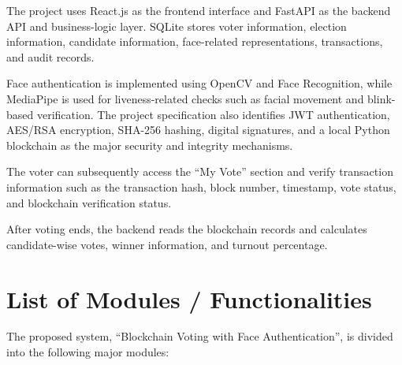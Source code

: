 \documentclass[12pt,a4paper]{report}
\begin{document}
The project uses React.js as the frontend interface and FastAPI as the backend API and business-logic layer. SQLite stores voter information, election information, candidate information, face-related representations, transactions, and audit records.

Face authentication is implemented using OpenCV and Face Recognition, while MediaPipe is used for liveness-related checks such as facial movement and blink-based verification. The project specification also identifies JWT authentication, AES/RSA encryption, SHA-256 hashing, digital signatures, and a local Python blockchain as the major security and integrity mechanisms.

The voter can subsequently access the ``My Vote'' section and verify transaction information such as the transaction hash, block number, timestamp, vote status, and blockchain verification status.

After voting ends, the backend reads the blockchain records and calculates candidate-wise votes, winner information, and turnout percentage.

\newpage

\chapter{List of Modules / Functionalities}

The proposed system, ``Blockchain Voting with Face Authentication'', is divided into the following major modules:
\end{document}
